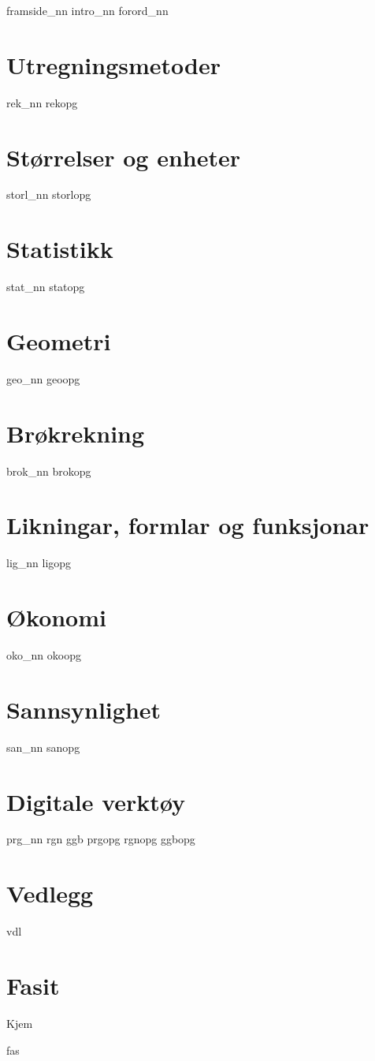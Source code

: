 




{framside_nn}
{intro_nn}
{forord_nn}

\tableofcontents
\chapter{Utregningsmetoder}
\newpage
{rek_nn}
{rekopg}

\chapter{Størrelser og enheter}
\newpage
{storl_nn}
\opgt
{storlopg}

\chapter{Statistikk}
\newpage
{stat_nn}
{statopg}

\chapter{Geometri}
\newpage
{geo_nn}
{geoopg}

\chapter{Brøkrekning \label{Br}}
\newpage
{brok_nn}
\newpage
{brokopg}

\chapter{Likningar, formlar og funksjonar \label{Lig}}
\newpage
{lig_nn}
{ligopg}

\chapter{Økonomi \label{Oko}}
\newpage
{oko_nn}
{okoopg}

\chapter{Sannsynlighet \label{San}} 
\newpage
{san_nn}
{sanopg}

\chapter{Digitale verktøy}
\newpage
{prg_nn}
{rgn}	
{ggb}	
\opgt
{prgopg}
{rgnopg}	
{ggbopg}	

\chapter*{Vedlegg} 
\newpage
{}
{vdl}


\chapter*{Fasit}
Kjem

{fas}







